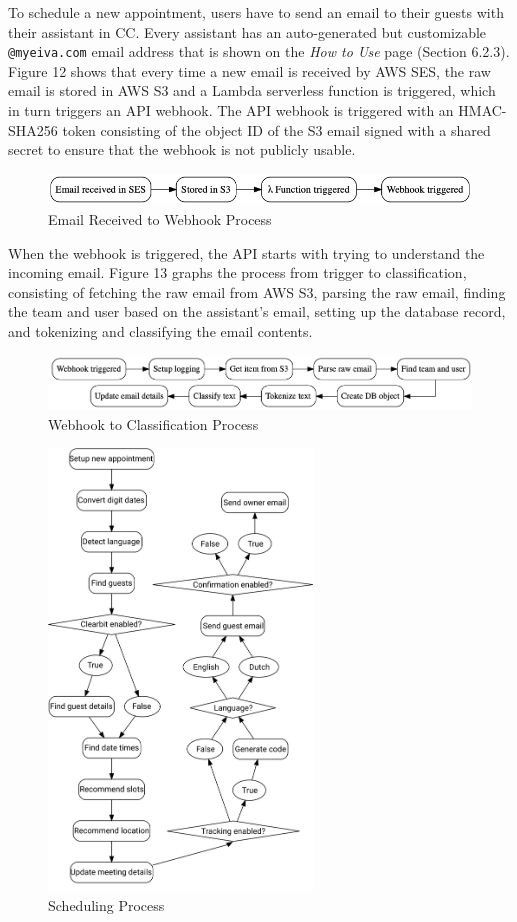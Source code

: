 \documentclass{article}
\begin{document}
To schedule a new appointment, users have to send an email to their guests with their assistant in CC. Every assistant has an auto-generated but customizable \texttt{@myeiva.com} email address that is shown on the \emph{How to Use} page (Section 6.2.3). Figure 12 shows that every time a new email is received by AWS SES, the raw email is stored in AWS S3 and a Lambda serverless function is triggered, which in turn triggers an API webhook. The API webhook is triggered with an HMAC-SHA256 token consisting of the object ID of the S3 email signed with a shared secret to ensure that the webhook is not publicly usable.

\begin{figure}[h]
	\includegraphics[width=\textwidth]{ses-process.png}
	\caption{Email Received to Webhook Process}
\end{figure}

When the webhook is triggered, the API starts with trying to understand the incoming email. Figure 13 graphs the process from trigger to classification, consisting of fetching the raw email from AWS S3, parsing the raw email, finding the team and user based on the assistant's email, setting up the database record, and tokenizing and classifying the email contents.

\begin{figure}[h]
	\includegraphics[width=\textwidth]{webhook-process.png}
	\caption{Webhook to Classification Process}
\end{figure}

\begin{figure}[h]
	\center
	\includegraphics[width=7cm]{schedule-process.png}
	\caption{Scheduling Process}
\end{figure}
\end{document}
